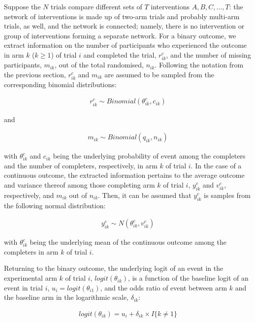 Suppose the \(N\) trials compare different sets of \(T\) interventions \({A, B, C,..., T}\):
the network of interventions is made up of two-arm trials and probably multi-arm trials, as well, and the network is connected; namely, there is no intervention or group of interventions forming a separate network. For a binary outcome, we extract information on the number of participants who experienced the
outcome in arm \(k\) (\(k \ge 1\)) of trial \(i\) and completed the trial, \(r^{c}_{ik}\), and the number of missing participants, \(m_{ik}\), out of the total randomised, \(n_{ik}\). Following the notation from the previous section, \(r^{c}_{ik}\) and \(m_{ik}\) are assumed to be sampled from the corresponding binomial distributions:

\[\begin{aligned}
r^{c}_{ik} \sim Binomial(\theta^{c}_{ik}, c_{ik})  
\end{aligned}\]

and

\[\begin{aligned}
m_{ik} \sim Binomial(q_{ik}, n_{ik})  
\end{aligned}\]

with \(\theta^{c}_{ik}\) and \(c_{ik}\) being the underlying probability of event among the completers and the number of completers, respectively, in arm \(k\) of trial \(i\). In the case of a continuous outcome, the extracted information pertains to the average outcome and variance thereof among those completing arm \(k\) of trial \(i\), \(y^{c}_{ik}\) and \(v^{c}_{ik}\), respectively, and \(m_{ik}\) out of \(n_{ik}\).
Then, it can be assumed that \(y^{c}_{ik}\) is samples from the following normal distribution:

\[\begin{aligned}
y^{c}_{ik} \sim N(\theta^{c}_{ik}, v^{c}_{ik})  
\end{aligned}\]

with \(\theta^{c}_{ik}\) being the underlying mean of the continuous outcome among the completers in arm \(k\) of trial \(i\).

Returning to the binary outcome, the underlying logit of an event in the experimental arm \(k\) of trial \(i\), \(logit(\theta_{ik})\), is a function of the baseline logit of an event in trial \(i\), \(u_{i} = logit(\theta_{i1})\), and the odds ratio of event between arm \(k\) and the baseline arm in the logarithmic scale, \(\delta_{ik}\):

\[\begin{aligned}
logit(\theta_{ik}) = u_{i} + \delta_{ik} \times I\{k \ne 1\}   
\end{aligned}\]

